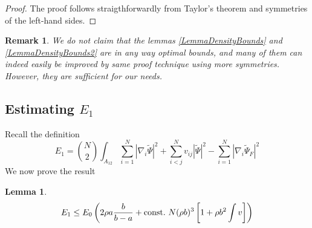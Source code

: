 \documentclass[a4paper,11pt]{article}
\newcommand{\abs}[1]{\left\lvert #1 \right\rvert}
\newtheorem{lemma}{Lemma}
\newtheorem{remark}{Remark}
\numberwithin{equation}{section}
\begin{document}
	\begin{proof}
		The proof follows straigthforwardly from Taylor's theorem and symmetries of the left-hand sides. 
	\end{proof}
	\begin{remark}
		We do not claim that the lemmas \ref{LemmaDensityBounds} and \ref{LemmaDensityBounds2} are in any way optimal bounds, and many of them can indeed easily be improved by same proof technique using more symmetries. However, they are sufficient for our needs.
	\end{remark}
	\subsection{Estimating $ E_1 $}
		Recall the definition \begin{equation}
		E_1=\binom{N}{2}\int_{A_{12}} \sum_{i=1}^{N}\abs{\nabla_i\tilde{\Psi}}^2+\sum_{i<j}^{N}v_{ij}\abs{\tilde{\Psi}}^2-\sum_{i=1}^{N}\abs{\nabla_i\tilde{\Psi}_F}^2
		\end{equation}
		We now prove the result \begin{lemma}\label{LemmaE1Bound}
			\begin{equation}
			E_1\leq E_0 \left(2\rho a\frac{b}{b-a}+ \textnormal{const.}\ N(\rho b)^3\left[ 1+ \rho b^2\int v\right]\right)
			\end{equation}
		\end{lemma}
\end{document}
